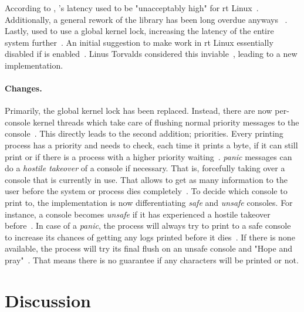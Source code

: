 \documentclass[10pt,twocolumn,a4paper]{article}
\begin{document}
\subsubsection{}
According to \citeauthor{edge_discussion_2022}, 's latency used to be "unacceptably high" for \acrshort{rt} Linux~\cite{edge_discussion_2022}.
Additionally, a general rework of the library has been long overdue anyways ~\cite{edge_discussion_2022}.
Lastly,  used to use a global kernel lock, increasing the latency of the entire system further~\cite{gleixner_printk_2024}.
An initial suggestion to make  work in \acrshort{rt} Linux essentially disabled  if  is enabled~\cite{mladek_printk_2022}.
Linus Torvalds considered this inviable~\cite{torvalds_initial_2022}, leading to a new implementation.

\paragraph{Changes.}
Primarily, the global kernel lock has been replaced.
Instead, there are now per-console kernel threads which take care of flushing normal priority messages to the console~\cite{gleixner_printk_2024}.
This directly leads to the second addition; priorities.
Every printing process has a priority and needs to check, each time it prints a byte, if it can still print or if there is a process with a higher priority waiting~\cite{edge_discussion_2022}.
\emph{panic} messages can do a \emph{hostile takeover} of a console if necessary.
That is, forcefully taking over a console that is currently in use.
That allows to get as many information to the user before the system or process dies completely~\cite{edge_discussion_2022}.
To decide which console to print to, the  implementation is now differentiating \emph{safe} and \emph{unsafe} consoles.
For instance, a console becomes \emph{unsafe} if it has experienced a hostile takeover before~\cite{kernel_development_community_console}.
In case of a \emph{panic}, the process will always try to print to a safe console to increase its chances of getting any logs printed before it dies~\cite{gleixner_printk_2024}.
If there is none available, the process will try its final flush on an unsafe console and "Hope and pray"~\cite{kernel_development_community_console}.
That means there is no guarantee if any characters will be printed or not.

\section{Discussion}
\end{document}

